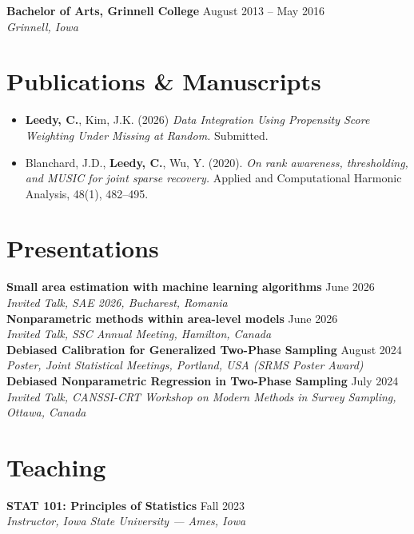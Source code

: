 \documentclass[11pt]{article}
\newcommand{\entry}[3]{%
  \noindent\textbf{#1} \hfill #3\\
  \textit{#2}\\[4pt]
}
\begin{document}
\entry{Bachelor of Arts, Grinnell College}{Grinnell, Iowa}{August 2013 -- May 2016}

\section*{Publications \& Manuscripts}
\begin{itemize}[leftmargin=2.2em,itemsep=6pt]

  \item[2.] \textbf{Leedy, C.}, Kim, J.K. (2026) \textit{Data Integration Using Propensity Score Weighting Under Missing at Random.} Submitted. 

  \item[1.] Blanchard, J.D., \textbf{Leedy, C.}, Wu, Y. (2020). \textit{On rank awareness, thresholding, and MUSIC for joint sparse recovery.} Applied and Computational Harmonic Analysis, 48(1), 482--495.
\end{itemize}

\section*{Presentations}
\entry{Small area estimation with machine learning algorithms}{Invited Talk, SAE
2026, Bucharest, Romania}{June 2026}
\entry{Nonparametric methods within area-level models}{Invited Talk, SSC Annual
Meeting, Hamilton, Canada}{June 2026}
\entry{Debiased Calibration for Generalized Two-Phase Sampling}{Poster, Joint Statistical Meetings, Portland, USA (SRMS Poster Award)}{August 2024}
\entry{Debiased Nonparametric Regression in Two-Phase Sampling}{Invited Talk, CANSSI-CRT Workshop on Modern Methods in Survey Sampling, Ottawa, Canada}{July 2024}

\section*{Teaching}
\entry{STAT 101: Principles of Statistics}{Instructor, Iowa State University --- Ames, Iowa}{Fall 2023}
\end{document}
